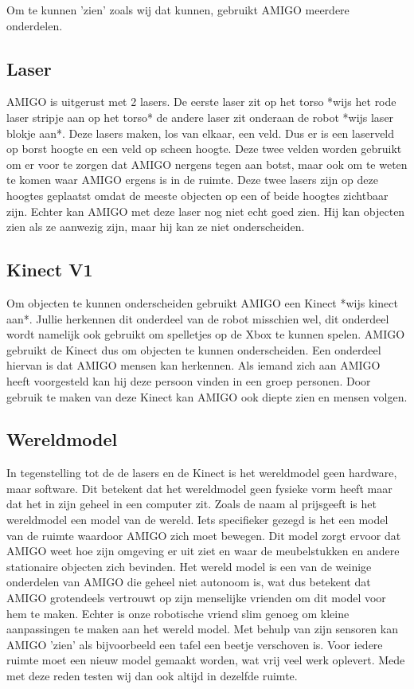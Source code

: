 \documentclass[a4paper,10pt]{article}
\numberwithin{equation}{section}
\numberwithin{figure}{section}
\numberwithin{table}{section}
\begin{document}
Om te kunnen 'zien' zoals wij dat kunnen, gebruikt AMIGO meerdere onderdelen.
\subsection*{Laser}
AMIGO is uitgerust met 2 lasers. De eerste laser zit op het torso *wijs het rode laser stripje aan op het torso* de andere laser zit onderaan de robot *wijs laser blokje aan*. Deze lasers maken, los van elkaar, een veld. Dus er is een laserveld op borst hoogte en een veld op scheen hoogte. Deze twee velden worden gebruikt om er voor te zorgen dat AMIGO nergens tegen aan botst, maar ook om te weten te komen waar AMIGO ergens is in de ruimte. Deze twee lasers zijn op deze hoogtes geplaatst omdat de meeste objecten op een of beide hoogtes zichtbaar zijn. Echter kan AMIGO met deze laser nog niet echt goed zien. Hij kan objecten zien als ze aanwezig zijn, maar hij kan ze niet onderscheiden. 

\subsection*{Kinect V1}
Om objecten te kunnen onderscheiden gebruikt AMIGO een Kinect *wijs kinect aan*. Jullie herkennen dit onderdeel van de robot misschien wel, dit onderdeel wordt namelijk ook gebruikt om spelletjes op de Xbox te kunnen spelen. AMIGO gebruikt de Kinect dus om objecten te kunnen onderscheiden. Een onderdeel hiervan is dat AMIGO mensen kan herkennen. Als iemand zich aan AMIGO heeft voorgesteld kan hij deze persoon vinden in een groep personen. Door gebruik te maken van deze Kinect kan AMIGO ook diepte zien en mensen volgen.

\subsection*{Wereldmodel}
In tegenstelling tot de de lasers en de Kinect is het wereldmodel geen hardware, maar software. Dit betekent dat het wereldmodel geen fysieke vorm heeft maar dat het in zijn geheel in een computer zit. Zoals de naam al prijsgeeft is het wereldmodel een model van de wereld. Iets specifieker gezegd is het een model van de ruimte waardoor AMIGO zich moet bewegen. Dit model zorgt ervoor dat AMIGO weet hoe zijn omgeving er uit ziet en waar de meubelstukken en andere stationaire objecten zich bevinden. Het wereld model is een van de weinige onderdelen van AMIGO die geheel niet autonoom is, wat dus betekent dat AMIGO grotendeels vertrouwt op zijn menselijke vrienden om dit model voor hem te maken. Echter is onze robotische vriend slim genoeg om kleine aanpassingen te maken aan het wereld model. Met behulp van zijn sensoren kan AMIGO 'zien' als bijvoorbeeld een tafel een beetje verschoven is. Voor iedere ruimte moet een nieuw model gemaakt worden, wat vrij veel werk oplevert. Mede met deze reden testen wij dan ook altijd in dezelfde ruimte.
\end{document}
